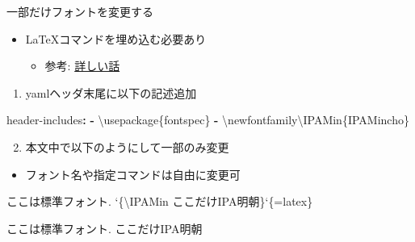 \documentclass[
  12pt,
  ignorenonframetext,
]{beamer}
\newenvironment{Shaded}{\begin{snugshade}}{\end{snugshade}}
\newcommand{\AttributeTok}[1]{\textcolor[rgb]{0.77,0.63,0.00}{#1}}
\newcommand{\BaseNTok}[1]{\textcolor[rgb]{0.00,0.00,0.81}{#1}}
\newcommand{\FunctionTok}[1]{\textcolor[rgb]{0.00,0.00,0.00}{#1}}
\newcommand{\KeywordTok}[1]{\textcolor[rgb]{0.13,0.29,0.53}{\textbf{#1}}}
\newcommand{\NormalTok}[1]{#1}
\providecommand{\tightlist}{%
  \setlength{\itemsep}{0pt}\setlength{\parskip}{0pt}}
\begin{document}
\begin{frame}[fragile]{一部だけフォントを変更する}
\protect\hypertarget{ux4e00ux90e8ux3060ux3051ux30d5ux30a9ux30f3ux30c8ux3092ux5909ux66f4ux3059ux308b}{}

\begin{itemize}
\tightlist
\item
  \LaTeX コマンドを埋め込む必要あり

  \begin{itemize}
  \tightlist
  \item
    参考: \href{http://zrbabbler.sp.land.to/xelatex.html}{詳しい話}
  \end{itemize}
\end{itemize}

\begin{enumerate}
\tightlist
\item
  yamlヘッダ末尾に以下の記述追加
\end{enumerate}

\begin{Shaded}
\begin{Highlighting}[]
\FunctionTok{header-includes}\KeywordTok{:}
\AttributeTok{  }\KeywordTok{-}\AttributeTok{ \textbackslash{}usepackage\{fontspec\}}
\AttributeTok{  }\KeywordTok{-}\AttributeTok{ \textbackslash{}newfontfamily\textbackslash{}IPAMin\{IPAMincho\}}
\end{Highlighting}
\end{Shaded}

\begin{enumerate}
\setcounter{enumi}{1}
\tightlist
\item
  本文中で以下のようにして一部のみ変更
\end{enumerate}

\begin{itemize}
\tightlist
\item
  フォント名や指定コマンドは自由に変更可
\end{itemize}

\begin{Shaded}
\begin{Highlighting}[]
\NormalTok{ここは標準フォント. }\BaseNTok{`\{\textbackslash{}IPAMin ここだけIPA明朝\}`}\NormalTok{\{=latex\}}
\end{Highlighting}
\end{Shaded}

ここは標準フォント. {\IPAMin ここだけIPA明朝}

\end{frame}
\end{document}
